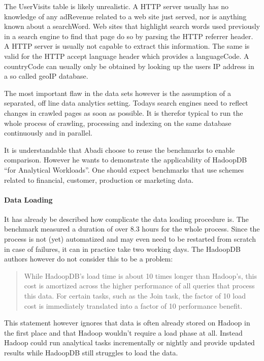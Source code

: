 \documentclass[12pt,a4paper]{scrartcl}		%
\begin{document}
The UserVisits table is likely unrealistic. A HTTP server usually has no knowledge of any adRevenue related to a web site just served, nor is anything known about a searchWord. Web sites that highlight search words used previously in a search engine to find that page do so by parsing the HTTP referrer header. A HTTP server is usually not capable to extract this information. The same is valid for the HTTP accept language header which provides a languageCode. A countryCode can usually only be obtained by looking up the users IP address in a so called geoIP database.

The most important flaw in the data sets however is the assumption of a separated, off line data analytics setting. Todays search engines need to reflect changes in crawled pages as soon as possible. It is therefor typical to run the whole process of crawling, processing and indexing on the same database continuously and in parallel.\cite{Peng:2010:LIP:1924943.1924961}

It is understandable that Abadi choose to reuse the benchmarks to enable comparison. However he wants to demonstrate the applicability of HadoopDB ``for Analytical Workloads''. One should expect benchmarks that use schemes related to financial, customer, production or marketing data.

\paragraph{Data Loading}
It has already be described how complicate the data loading procedure is. The benchmark measured a duration of over 8.3 hours for the whole process. Since the process is not (yet) automatized and may even need to be restarted from scratch in case of failures, it can in practice take two working days. The HadoopDB authors however do not consider this to be a problem\cite[6.3]{journals/pvldb/AbouzeidBARS09}:

\begin{quote}
While HadoopDB’s load time is about 10 times longer than
Hadoop’s, this cost is amortized across the higher performance of
all queries that process this data. For certain tasks, such as the Join
task, the factor of 10 load cost is immediately translated into a
factor of 10 performance benefit.
\end{quote}

This statement however ignores that data is often already stored on Hadoop in the first place and that Hadoop wouldn't require a load phase at all. Instead Hadoop could run analytical tasks incrementally or nightly and provide updated results while HadoopDB still struggles to load the data.
\end{document}
